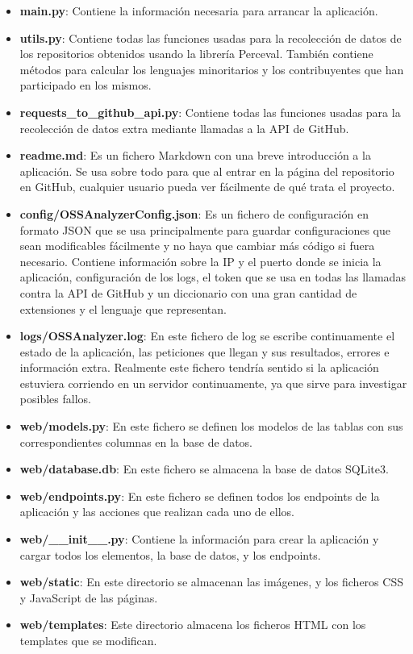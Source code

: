 \documentclass[a4paper, 12pt]{book}
\begin{document}
\begin{itemize}
  \item \textbf{main.py}: Contiene la información necesaria para arrancar la aplicación.
  \item \textbf{utils.py}: Contiene todas las funciones usadas para la recolección de datos de los repositorios obtenidos usando la librería Perceval. También contiene métodos para calcular los lenguajes minoritarios y los contribuyentes que han participado en los mismos.
  \item \textbf{requests\_to\_github\_api.py}: Contiene todas las funciones usadas para la recolección de datos extra mediante llamadas a la API de GitHub.
  \item \textbf{readme.md}: Es un fichero Markdown con una breve introducción a la aplicación. Se usa sobre todo para que al entrar en la página del repositorio en GitHub, cualquier usuario pueda ver fácilmente de qué trata el proyecto.
  \item \textbf{config/OSSAnalyzerConfig.json}: Es un fichero de configuración en formato JSON que se usa principalmente para guardar configuraciones que sean modificables fácilmente y no haya que cambiar más código si fuera necesario. Contiene información sobre la IP y el puerto donde se inicia la aplicación, configuración de los logs, el token que se usa en todas las llamadas contra la API de GitHub y un diccionario con una gran cantidad de extensiones y el lenguaje que representan.
  \item \textbf{logs/OSSAnalyzer.log}: En este fichero de log se escribe continuamente el estado de la aplicación, las peticiones que llegan y sus resultados, errores e información extra. Realmente este fichero tendría sentido si la aplicación estuviera corriendo en un servidor continuamente, ya que sirve para investigar posibles fallos.
  \item \textbf{web/models.py}: En este fichero se definen los modelos de las tablas con sus correspondientes columnas en la base de datos.
  \item \textbf{web/database.db}: En este fichero se almacena la base de datos SQLite3.
  \item \textbf{web/endpoints.py}: En este fichero se definen todos los endpoints de la aplicación y las acciones que realizan cada uno de ellos.
  \item \textbf{web/\_\_init\_\_.py}: Contiene la información para crear la aplicación y cargar todos los elementos, la base de datos, y los endpoints.
  \item \textbf{web/static}: En este directorio se almacenan las imágenes, y los ficheros CSS y JavaScript de las páginas.
  \item \textbf{web/templates}: Este directorio almacena los ficheros HTML con los templates que se modifican.
\end{itemize}
\end{document}
